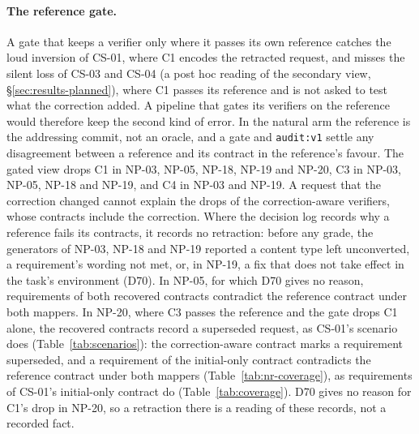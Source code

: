 \paragraph{The reference gate.} A gate that keeps a verifier only where it passes its own reference catches the loud inversion of CS-01, where C1 encodes the retracted request, and misses the silent loss of CS-03 and CS-04 (a post hoc reading of the secondary view, \S\ref{sec:results-planned}), where C1 passes its reference and is not asked to test what the correction added. A pipeline that gates its verifiers on the reference would therefore keep the second kind of error. In the natural arm the reference is the addressing commit, not an oracle, and a gate and \texttt{audit:v1} settle any disagreement between a reference and its contract in the reference's favour. The gated view drops C1 in NP-03, NP-05, NP-18, NP-19 and NP-20, C3 in NP-03, NP-05, NP-18 and NP-19, and C4 in NP-03 and NP-19. A request that the correction changed cannot explain the drops of the correction-aware verifiers, whose contracts include the correction. Where the decision log records why a reference fails its contracts, it records no retraction: before any grade, the generators of NP-03, NP-18 and NP-19 reported a content type left unconverted, a requirement's wording not met, or, in NP-19, a fix that does not take effect in the task's environment (D70). In NP-05, for which D70 gives no reason, requirements of both recovered contracts contradict the reference contract under both mappers. In NP-20, where C3 passes the reference and the gate drops C1 alone, the recovered contracts record a superseded request, as CS-01's scenario does (Table~\ref{tab:scenarios}): the correction-aware contract marks a requirement superseded, and a requirement of the initial-only contract contradicts the reference contract under both mappers (Table~\ref{tab:nr-coverage}), as requirements of CS-01's initial-only contract do (Table~\ref{tab:coverage}). D70 gives no reason for C1's drop in NP-20, so a retraction there is a reading of these records, not a recorded fact.

